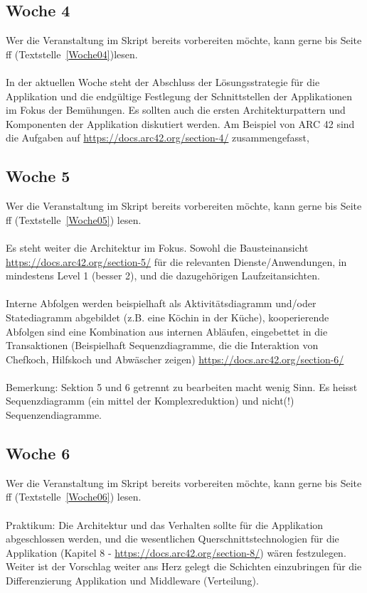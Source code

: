 \subsection{Woche 4}
Wer die Veranstaltung im Skript bereits vorbereiten möchte, kann gerne bis Seite \pageref{Woche04}ff (Textstelle~\ref{Woche04})lesen. 
\\\\
In der aktuellen Woche steht der Abschluss der Lösungsstrategie  für die Applikation und die endgültige Festlegung der Schnittstellen der Applikationen im Fokus der Bemühungen. Es sollten auch die ersten Architekturpattern und Komponenten der Applikation diskutiert werden. Am Beispiel von ARC 42 sind die Aufgaben auf \url{https://docs.arc42.org/section-4/} zusammengefasst, 

\subsection{Woche 5}
Wer die Veranstaltung im Skript bereits vorbereiten möchte, kann gerne bis Seite  \pageref{Woche05}ff (Textstelle~\ref{Woche05}) lesen. 
\\\\ 
Es steht weiter die Architektur im Fokus. Sowohl die Bausteinansicht \url{https://docs.arc42.org/section-5/} für die relevanten Dienste/Anwendungen, in mindestens Level 1 (besser 2), und die dazugehörigen Laufzeitansichten. 
\\\\
Interne Abfolgen werden beispielhaft als Aktivitätsdiagramm und/oder Statediagramm abgebildet (z.B. eine Köchin in der Küche), kooperierende Abfolgen sind eine Kombination aus internen Abläufen, eingebettet in die Transaktionen (Beispielhaft Sequenzdiagramme, die die Interaktion von Chefkoch, Hilfskoch und Abwäscher zeigen) \url{https://docs.arc42.org/section-6/}
\\\\ 
Bemerkung: Sektion 5 und 6 getrennt zu bearbeiten macht wenig Sinn. Es heisst Sequenzdiagramm (ein mittel der Komplexreduktion) und nicht(!) Sequenzendiagramme.
\subsection{Woche 6}
Wer die Veranstaltung  im Skript bereits vorbereiten möchte, kann gerne bis Seite \pageref{Woche06}ff (Textstelle~\ref{Woche06}) lesen. 
\\\\
Praktikum: Die Architektur und das Verhalten sollte für die Applikation abgeschlossen werden, und die wesentlichen Querschnittstechnologien für die Applikation (Kapitel 8 - \url{https://docs.arc42.org/section-8/}) wären festzulegen. Weiter ist der Vorschlag weiter ans Herz gelegt die Schichten einzubringen für die Differenzierung Applikation und Middleware (Verteilung).  
